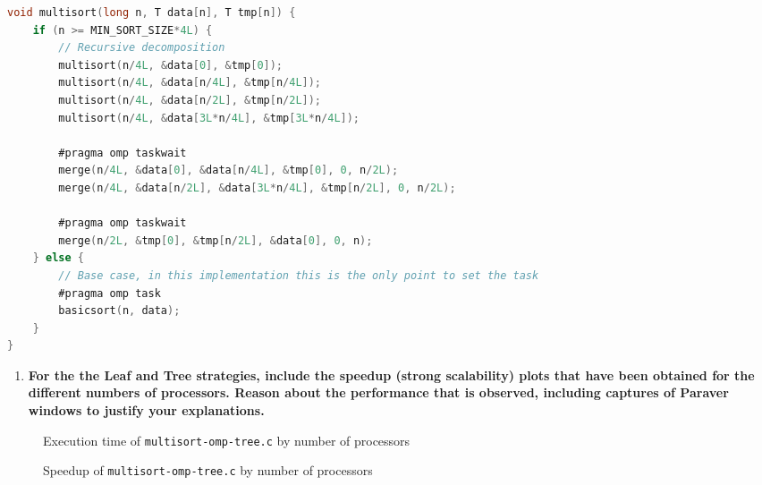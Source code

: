 \documentclass[a4paper]{article}
\newenvironment{questionenum}{%
\setlist[enumerate]{resume}
\restartlist{enumerate}
\newcommand{\question}[1]{
\begin{enumerate}
	\item\bfseries ##1
\end{enumerate}
}}{%
}
\begin{document}
\begin{questionenum}
\begin{lstlisting}[language=C, title=\texttt{multisort-omp-leaf.c}]
void multisort(long n, T data[n], T tmp[n]) {
    if (n >= MIN_SORT_SIZE*4L) {
        // Recursive decomposition
        multisort(n/4L, &data[0], &tmp[0]);
        multisort(n/4L, &data[n/4L], &tmp[n/4L]);
        multisort(n/4L, &data[n/2L], &tmp[n/2L]);
        multisort(n/4L, &data[3L*n/4L], &tmp[3L*n/4L]);
        
        #pragma omp taskwait
        merge(n/4L, &data[0], &data[n/4L], &tmp[0], 0, n/2L);
        merge(n/4L, &data[n/2L], &data[3L*n/4L], &tmp[n/2L], 0, n/2L);
        
        #pragma omp taskwait
        merge(n/2L, &tmp[0], &tmp[n/2L], &data[0], 0, n);
    } else {
        // Base case, in this implementation this is the only point to set the task
        #pragma omp task
        basicsort(n, data);
    }
}
    \end{lstlisting}
    
    \question{For the the Leaf and Tree strategies, include the speedup (strong scalability) plots that have been obtained for the different numbers of processors. Reason about the performance that is observed, including captures of Paraver windows to justify your explanations.}
    
    \begin{figure}[H]
        \centering
        \begin{minipage}[t]{0.49\textwidth}
            \caption{Execution time of \texttt{multisort-omp-tree.c} by number of processors}
            \label{fig:tree_time}
        \end{minipage}
        \hfill
        \begin{minipage}[t]{0.49\textwidth}
            \caption{Speedup of \texttt{multisort-omp-tree.c} by number of processors}
            \label{fig:tree_speedup}
        \end{minipage}
    \end{figure}



\end{questionenum}
\end{document}
